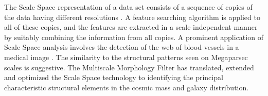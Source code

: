 The Scale Space representation of a data set consists of a sequence of copies of the data having different resolutions 
\citep{florack1992,lindeberg1998}. A feature searching algorithm is applied to all of these copies, and the features are extracted in a 
scale independent manner by suitably combining the information from all copies. A prominent application of Scale Space analysis involves 
the detection of the web of blood vessels in a medical image \citep{sato1998,li2003}. The similarity to the structural patterns seen on 
Megaparsec scales is suggestive. The Multiscale Morphology Filter has translated, extended and optimized the Scale Space technology to 
identifying the principal characteristic structural elements in the cosmic mass and galaxy distribution.  
